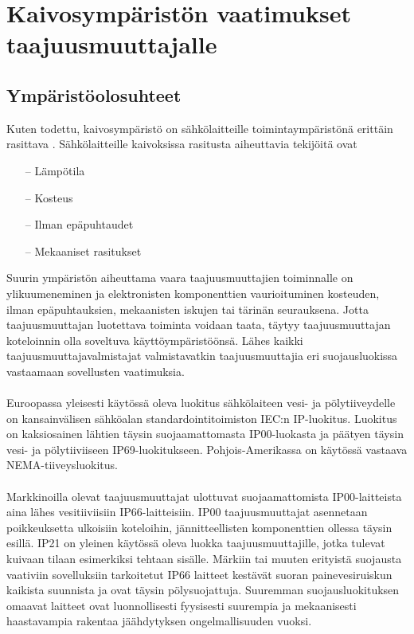 \documentclass[finnish,12pt,a4paper,pdftex,elec,utf8]{aaltothesis}
\begin{document}
\clearpage

\section{Kaivosympäristön vaatimukset taajuusmuuttajalle}

\subsection{Ympäristöolosuhteet}
Kuten todettu, kaivosympäristö on sähkölaitteille toimintaympäristönä erittäin rasittava \cite[s. 251]{Hakapää}. %
Sähkölaitteille kaivoksissa rasitusta aiheuttavia tekijöitä ovat
\begin{itemize}
	\item[--] Lämpötila
	\item[--] Kosteus
	\item[--] Ilman epäpuhtaudet
	\item[--] Mekaaniset rasitukset
\end{itemize}
Suurin ympäristön aiheuttama vaara taajuusmuuttajien toiminnalle on ylikuumeneminen ja elektronisten komponenttien vaurioituminen kosteuden, ilman  epäpuhtauksien, mekaanisten iskujen tai tärinän seurauksena. Jotta taajuusmuuttajan luotettava toiminta voidaan taata, täytyy taajuusmuuttajan koteloinnin olla soveltuva käyttöympäristöönsä. Lähes kaikki taajuusmuuttajavalmistajat valmistavatkin taajuusmuuttajia eri suojausluokissa vastaamaan sovellusten vaatimuksia.
\\\\
Euroopassa yleisesti käytössä oleva luokitus sähkölaiteen vesi- ja pölytiiveydelle on kansainvälisen sähköalan standardointitoimiston IEC:n IP-luokitus. Luokitus on kaksiosainen lähtien täysin suojaamattomasta IP00-luokasta ja päätyen täysin vesi- ja pölytiiviiseen IP69-luokitukseen. %
Pohjois-Amerikassa on käytössä vastaava NEMA-tiiveysluokitus.
\\\\
Markkinoilla olevat taajuusmuuttajat ulottuvat suojaamattomista IP00-laitteista aina lähes vesitiiviisiin IP66-laitteisiin. IP00 taajuusmuuttajat asennetaan poikkeuksetta ulkoisiin koteloihin, jännitteellisten komponenttien ollessa täysin esillä. IP21 on yleinen käytössä oleva luokka taajuusmuuttajille, jotka tulevat kuivaan tilaan esimerkiksi tehtaan sisälle. Märkiin tai muuten erityistä suojausta vaativiin sovelluksiin tarkoitetut IP66 laitteet kestävät suoran painevesiruiskun kaikista suunnista ja ovat täysin pölysuojattuja. Suuremman suojausluokituksen omaavat laitteet ovat luonnollisesti fyysisesti suurempia ja mekaanisesti haastavampia rakentaa jäähdytyksen ongelmallisuuden vuoksi.
\end{document}
